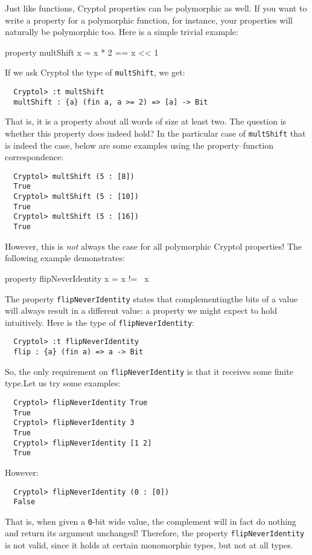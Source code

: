 Just like functions, Cryptol properties can be polymorphic as well. If
you want to write a property for a polymorphic function, for instance,
your properties will naturally be polymorphic too. Here is a simple
trivial example:
\begin{code}
  property multShift x = x * 2 == x << 1
\end{code}
If we ask Cryptol the type of {\tt multShift}, we get:
\begin{Verbatim}
  Cryptol> :t multShift
  multShift : {a} (fin a, a >= 2) => [a] -> Bit
\end{Verbatim}
That is, it is a property about all words of size at least two. The
question is whether this property does indeed hold? In the particular
case of {\tt multShift} that is indeed the case, below are some
examples using the property--function correspondence:\indThmFuncCorr
\begin{Verbatim}
  Cryptol> multShift (5 : [8])
  True
  Cryptol> multShift (5 : [10])
  True
  Cryptol> multShift (5 : [16])
  True
\end{Verbatim}
However, this is \emph{not} always the case for all polymorphic Cryptol
properties! The following example demonstrates:
\begin{code}
  property flipNeverIdentity x = x != ~x
\end{code}
The property {\tt flipNeverIdentity} states that
complementing\indComplement the bits of a value will always result in
a different value: a property we might expect to hold
intuitively. Here is the type of {\tt flipNeverIdentity}:
\begin{Verbatim}
  Cryptol> :t flipNeverIdentity
  flip : {a} (fin a) => a -> Bit
\end{Verbatim}
So, the only requirement on {\tt flipNeverIdentity} is that it
receives some finite type.\indFin Let us try some examples:
\begin{Verbatim}
  Cryptol> flipNeverIdentity True
  True
  Cryptol> flipNeverIdentity 3
  True
  Cryptol> flipNeverIdentity [1 2]
  True
\end{Verbatim}
However:
\begin{Verbatim}
  Cryptol> flipNeverIdentity (0 : [0])
  False
\end{Verbatim}
That is, when given a {\tt 0}-bit wide value, the complement will in
fact do nothing and return its argument unchanged! Therefore, the
property {\tt flipNeverIdentity} is not valid, since it holds at
certain monomorphic types, but not at all types.\indMonomorphism

